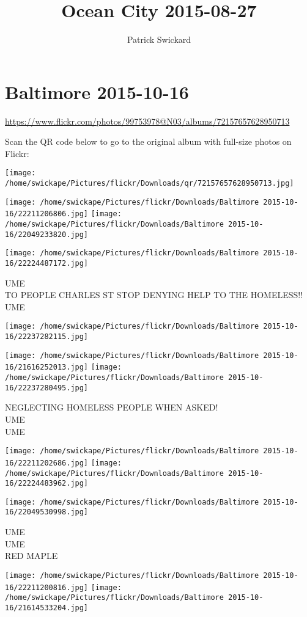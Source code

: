 \documentclass[10pt,letterpaper]{article}
\title{Ocean City 2015-08-27}
\author{Patrick Swickard}
\date{}
\begin{document}
\section*{Baltimore 2015-10-16}

\url{https://www.flickr.com/photos/99753978@N03/albums/72157657628950713}

Scan the QR code below to go to the original album with full-size photos on Flickr:

\texttt{[image: /home/swickape/Pictures/flickr/Downloads/qr/72157657628950713.jpg]}
\pagebreak

\texttt{[image: /home/swickape/Pictures/flickr/Downloads/Baltimore 2015-10-16/22211206806.jpg]}
\texttt{[image: /home/swickape/Pictures/flickr/Downloads/Baltimore 2015-10-16/22049233820.jpg]}

\texttt{[image: /home/swickape/Pictures/flickr/Downloads/Baltimore 2015-10-16/22224487172.jpg]}

UME\\
TO PEOPLE CHARLES ST STOP DENYING HELP TO THE HOMELESS!!\\
UME
\pagebreak

\texttt{[image: /home/swickape/Pictures/flickr/Downloads/Baltimore 2015-10-16/22237282115.jpg]}

\vspace{0.25in}
\texttt{[image: /home/swickape/Pictures/flickr/Downloads/Baltimore 2015-10-16/21616252013.jpg]}
\texttt{[image: /home/swickape/Pictures/flickr/Downloads/Baltimore 2015-10-16/22237280495.jpg]}

NEGLECTING HOMELESS PEOPLE WHEN ASKED!\\
UME\\
UME
\pagebreak

\texttt{[image: /home/swickape/Pictures/flickr/Downloads/Baltimore 2015-10-16/22211202686.jpg]}
\texttt{[image: /home/swickape/Pictures/flickr/Downloads/Baltimore 2015-10-16/22224483962.jpg]}

\vspace{0.25in}
\texttt{[image: /home/swickape/Pictures/flickr/Downloads/Baltimore 2015-10-16/22049530998.jpg]}

UME\\
UME\\
RED MAPLE
\pagebreak

\texttt{[image: /home/swickape/Pictures/flickr/Downloads/Baltimore 2015-10-16/22211200816.jpg]}
\texttt{[image: /home/swickape/Pictures/flickr/Downloads/Baltimore 2015-10-16/21614533204.jpg]}
\end{document}
